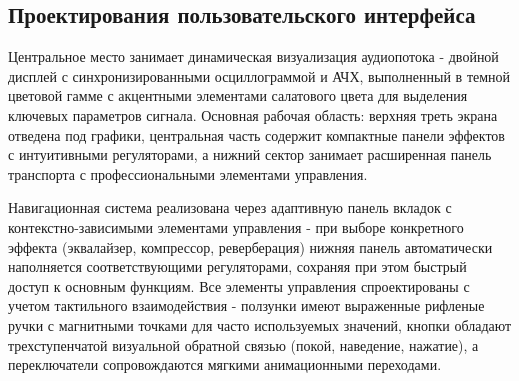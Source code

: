 \subsection{Проектирования пользовательского интерфейса}

Центральное место занимает динамическая визуализация аудиопотока - двойной дисплей с синхронизированными осциллограммой и АЧХ, выполненный в темной цветовой гамме с акцентными элементами салатового цвета для выделения ключевых параметров сигнала. Основная рабочая область: верхняя треть экрана отведена под графики, центральная часть содержит компактные панели эффектов с интуитивными регуляторами, а нижний сектор занимает расширенная панель транспорта с профессиональными элементами управления.

Навигационная система реализована через адаптивную панель вкладок с контекстно-зависимыми элементами управления - при выборе конкретного эффекта (эквалайзер, компрессор, реверберация) нижняя панель автоматически наполняется соответствующими регуляторами, сохраняя при этом быстрый доступ к основным функциям. Все элементы управления спроектированы с учетом тактильного взаимодействия - ползунки имеют выраженные рифленые ручки с магнитными точками для часто используемых значений, кнопки обладают трехступенчатой визуальной обратной связью (покой, наведение, нажатие), а переключатели сопровождаются мягкими анимационными переходами.

